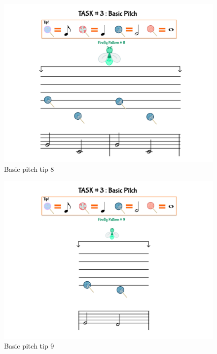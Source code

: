 \begin{figure}[H]
    \centering
    \includegraphics[width=12cm]{figures/NewFigures/BasicPitchTip8.png}
    \caption{Basic pitch tip 8}
    \label{fig:BasicPitchTip8}
\end{figure}

\begin{figure}[H]
    \centering
    \includegraphics[width=12cm]{figures/NewFigures/BasicPitchTip9.png}
    \caption{Basic pitch tip 9}
    \label{fig:BasicPitchTip9}
\end{figure}

